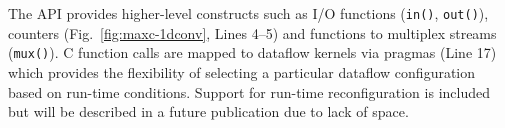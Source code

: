 The \MAXC{} API provides higher-level constructs such as I/O functions
(\texttt{in()}, \texttt{out()}), counters (Fig.~\ref{fig:maxc-1dconv},
Lines 4--5) and functions to multiplex streams (\texttt{mux()}). C
function calls are mapped to dataflow kernels via pragmas (Line 17)
which provides the flexibility of selecting a particular dataflow
configuration based on run-time conditions. Support for run-time
reconﬁguration is included but will be described in a future
publication due to lack of space.
